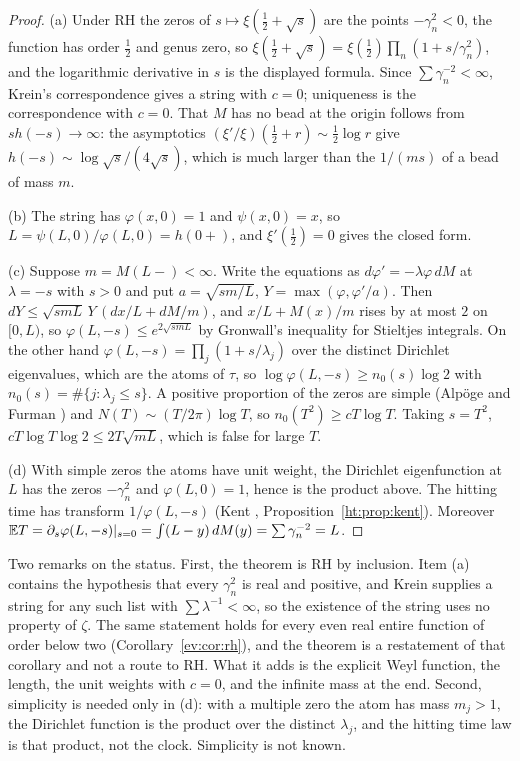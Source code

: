 \begin{proof}
(a) Under RH the zeros of $s\mapsto\xi(\frac12+\sqrt s)$ are the points $-\gamma_n^2<0$, the function has order $\frac12$ and genus zero, so $\xi(\frac12+\sqrt s)=\xi(\frac12)\prod_n(1+s/\gamma_n^2)$, and the logarithmic derivative in $s$ is the displayed formula. Since $\sum\gamma_n^{-2}<\infty$, Krein's correspondence gives a string with $c=0$; uniqueness is the correspondence with $c=0$. That $M$ has no bead at the origin follows from $sh(-s)\to\infty$: the asymptotics $(\xi'/\xi)(\frac12+r)\sim\frac12\log r$ give $h(-s)\sim\log\sqrt s/(4\sqrt s)$, which is much larger than the $1/(ms)$ of a bead of mass $m$.

(b) The string has $\varphi(x,0)=1$ and $\psi(x,0)=x$, so $L=\psi(L,0)/\varphi(L,0)=h(0+)$, and $\xi'(\frac12)=0$ gives the closed form.

(c) Suppose $m=M(L-)<\infty$. Write the equations as $d\varphi'=-\lambda\varphi\,dM$ at $\lambda=-s$ with $s>0$ and put $a=\sqrt{sm/L}$, $Y=\max(\varphi,\varphi'/a)$. Then $dY\le\sqrt{smL}\,Y\,(dx/L+dM/m)$, and $x/L+M(x)/m$ rises by at most $2$ on $[0,L)$, so $\varphi(L,-s)\le e^{2\sqrt{smL}}$ by Gronwall's inequality for Stieltjes integrals. On the other hand $\varphi(L,-s)=\prod_j(1+s/\lambda_j)$ over the distinct Dirichlet eigenvalues, which are the atoms of $\tau$, so $\log\varphi(L,-s)\ge n_0(s)\log2$ with $n_0(s)=\#\{j:\lambda_j\le s\}$. A positive proportion of the zeros are simple (Alp\"oge and Furman \cite{AF26}) and $N(T)\sim(T/2\pi)\log T$, so $n_0(T^2)\ge cT\log T$. Taking $s=T^2$, $cT\log T\log2\le2T\sqrt{mL}$, which is false for large $T$.

(d) With simple zeros the atoms have unit weight, the Dirichlet eigenfunction at $L$ has the zeros $-\gamma_n^2$ and $\varphi(L,0)=1$, hence is the product above. The hitting time has transform $1/\varphi(L,-s)$ (Kent \cite{Kent80}, Proposition~\ref{ht:prop:kent}). Moreover $\mathbb{E} T=\partial_s\varphi(L,-s)|_{s=0}=\int(L-y)\,dM(y)=\sum\gamma_n^{-2}=L$.
\end{proof}

Two remarks on the status. First, the theorem is RH by inclusion. Item (a) contains the hypothesis that every $\gamma_n^2$ is real and positive, and Krein supplies a string for any such list with $\sum\lambda^{-1}<\infty$, so the existence of the string uses no property of $\zeta$. The same statement holds for every even real entire function of order below two (Corollary~\ref{ev:cor:rh}), and the theorem is a restatement of that corollary and not a route to RH. What it adds is the explicit Weyl function, the length, the unit weights with $c=0$, and the infinite mass at the end. Second, simplicity is needed only in (d): with a multiple zero the atom has mass $m_j>1$, the Dirichlet function is the product over the distinct $\lambda_j$, and the hitting time law is that product, not the clock. Simplicity is not known.

